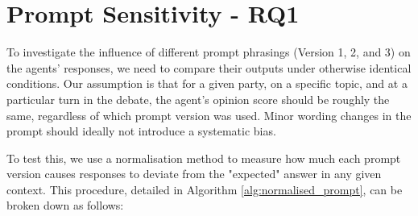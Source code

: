 \section{Prompt Sensitivity - RQ1}

To investigate the influence of different prompt phrasings (Version 1, 2, and 3) on the agents' responses, we need to compare their outputs under otherwise identical conditions. Our assumption is that for a given party, on a specific topic, and at a particular turn in the debate, the agent's opinion score should be roughly the same, regardless of which prompt version was used. Minor wording changes in the prompt should ideally not introduce a systematic bias.

To test this, we use a normalisation method to measure how much each prompt version causes responses to deviate from the "expected" answer in any given context. This procedure, detailed in Algorithm \ref{alg:normalised_prompt}, can be broken down as follows:


